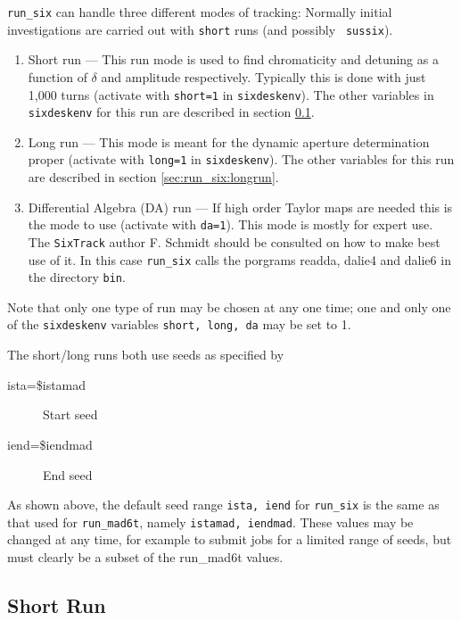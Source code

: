 \documentclass{cernatsnote}
\begin{document}
\texttt{run\_six} can handle three different modes of tracking: Normally initial
investigations are carried out with \texttt{short} runs (and possibly {\tt
sussix}).

\begin{enumerate}
  \item Short run ---
  This run mode is used to find chromaticity and detuning as a function of
  $\delta$ and amplitude respectively. Typically this is done with just 1,000
  turns (activate with \texttt{short=1} in \texttt{sixdeskenv}).  The other variables
  in \texttt{sixdeskenv} for this run are described in section
  \ref{sec:run_six:shortrun}.
\item Long run ---
  This mode is meant for the dynamic aperture determination proper (activate
  with \texttt{long=1} in \texttt{sixdeskenv}).  The other variables for this run are
  described in section \ref{sec:run_six:longrun}.
\item Differential Algebra (DA) run --- If high order Taylor maps are needed
  this is the mode to use (activate with \texttt{da=1}). This mode is mostly for
  expert use.  The \texttt{SixTrack} author F. Schmidt should be consulted on how
  to make best use of it.  In this case \texttt{run\_six} calls the porgrams
  readda, dalie4 and dalie6 in the directory \texttt{bin}.
\end{enumerate}

Note that only one type of run may be chosen at any one time; one and only one
of the \texttt{sixdeskenv} variables \texttt{short, long, da} may be set to 1.

The short/long runs both use seeds as specified by
\begin{description}
\item[ista=\$istamad] Start seed
\item[iend=\$iendmad] End seed
\end{description}
As shown above, the default seed range \texttt{ista, iend} for \texttt{run\_six} is
the same as that used for \texttt{run\_mad6t}, namely \texttt{istamad, iendmad}.
These values may be changed at any time, for example to submit jobs for a
limited range of seeds, but must clearly be a subset of the {run\_mad6t}
values.

\subsection{Short Run}
\label{sec:run_six:shortrun}
\end{document}
